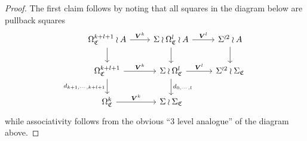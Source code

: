 \documentclass[a4paper,10pt
,draft
]{article}%
\numberwithin{equation}{section}
\numberwithin{figure}{section}
\theoremstyle{definition} %
\newcommand{\1}{\ensuremath{\mathbbm 1}}%
\begin{document}
\begin{proof}
	The first claim follows by noting that all squares in the diagram below are pullback squares
	\[
	\begin{tikzcd}
	\Omega^{k+l+1}_{\mathfrak{C}} \wr A \ar{r}{\boldsymbol{V}^k} \ar{d} &
	\Sigma \wr \Omega^{l}_{\mathfrak{C}} \wr A  \ar{d} \ar{r}{\boldsymbol{V}^l} &
	\Sigma^{\wr 2} \wr A \ar{d}
	\\
	\Omega^{k+l+1}_{\mathfrak{C}} \ar{r}{\boldsymbol{V}^k} 
	\ar{d}[swap]{d_{k+1,\cdots,k+l+1}} &
	\Sigma \wr \Omega^{l}_{\mathfrak{C}} \ar{r}{\boldsymbol{V}^l}
	\ar{d}{d_{0,\cdots,l}} &
	\Sigma^{\wr 2} \wr \Sigma_{\mathfrak{C}}
	\\
	\Omega^{k}_{\mathfrak{C}} \ar{r}{\boldsymbol{V}^k} &
	\Sigma \wr \Sigma_{\mathfrak{C}}
	\end{tikzcd}
	\]
	while associativity follows from the obvious 
	``3 level analogue'' of the diagram above.
	

\end{proof}
\end{document}
